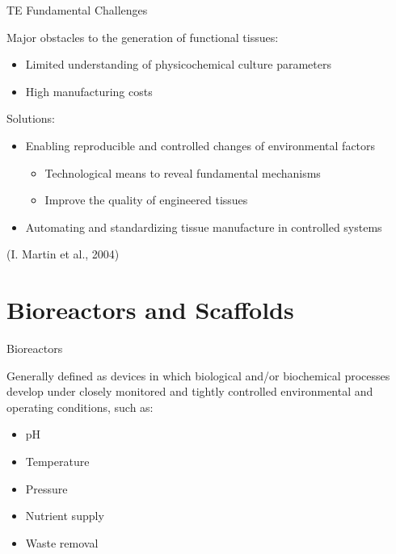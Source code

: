 \documentclass[11pt,t]{beamer}
\begin{document}
\begin{frame}[fragile]{TE Fundamental Challenges}  

Major obstacles to the generation of functional tissues:

\begin{itemize}
\item
Limited understanding of physicochemical culture parameters
\item
High manufacturing costs
\end{itemize}

Solutions:

\begin{itemize}
\item
Enabling reproducible and controlled changes of environmental factors
\begin{itemize}
\item
Technological
means to reveal fundamental mechanisms
\item
Improve
the quality of engineered tissues
\end{itemize}
\item
Automating and standardizing tissue manufacture in
controlled systems
\end{itemize}


\footnotesize(I. Martin et al., 2004)

\end{frame}


\section{Bioreactors and Scaffolds}
\begin{frame}[fragile]{Bioreactors}  

Generally defined as devices in which
biological and/or biochemical processes develop under
closely monitored and tightly controlled environmental
and operating conditions, such as:
\begin{itemize}
\item
pH
\item
Temperature
\item
Pressure
\item
Nutrient supply
\item
Waste removal
\end{itemize}
\end{frame}
\end{document}
